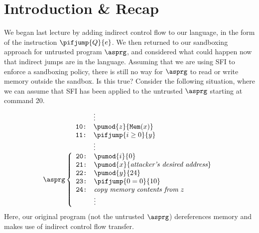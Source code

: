 \documentclass[11pt,twoside]{scrartcl}
\begin{document}
\newcommand{\atrace}{\sigma}%
\newcommand{\stdI}{\dTLint[state=\omega]}%
\newcommand{\Ip}{\dTLint[trace=\atrace]}%
\newcommand{\ws}{\omega}\newcommand{\wt}{\nu}%

\maketitle
\thispagestyle{empty}


\section{Introduction \& Recap}

We began last lecture by adding indirect control flow to our language, in the form of the instruction $\pifjump{\ivr}{\astrm}$.
We then returned to our sandboxing approach for untrusted program $\asprg$, and considered what could happen now that indirect jumps are in the language. Assuming that we are using SFI to enforce a sandboxing policy, there is still no way for $\asprg$ to read or write memory outside the sandbox. Is this true? Consider the following situation, where we can assume that SFI has been applied to the untrusted $\asprg$ starting at command 20.
\[
\begin{array}{l}
\phantom{\asprg\Big\{\ }
\begin{array}{ll}
& \vdots \\
\keywordfont{10:} & \pumod{z}{\pderef{x}} \\
\keywordfont{11:} & \pifjump{i\ge0}{y} \\
& \vdots \\
\end{array}
\\
\asprg\left\{
\begin{array}{ll}
\keywordfont{20:} & \pumod{i}{0} \\
\keywordfont{21:} & \pumod{x}{\textit{attacker's desired address}} \\
\keywordfont{22:} & \pumod{y}{24} \\
\keywordfont{23:} & \pifjump{0=0}{10} \\
\keywordfont{24:} & \textit{copy memory contents from}~z~ \\
& \vdots \\
\end{array}
\right.
\end{array}
\]
Here, our original program (not the untrusted $\asprg$) dereferences memory and makes use of indirect control flow transfer.
\end{document}
